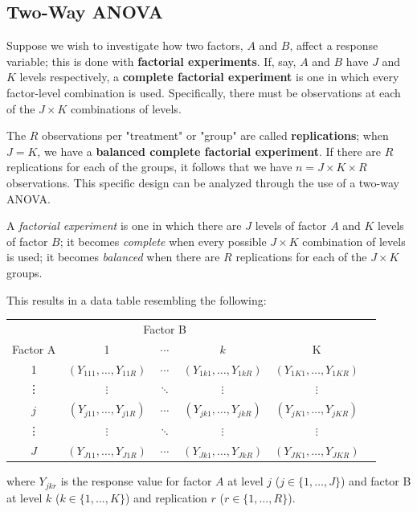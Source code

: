 \documentclass[12pt]{article}
\begin{document}
\subsection{Two-Way ANOVA}
Suppose we wish to investigate how two factors, $A$ and $B$, affect a response variable; this is done with \textbf{factorial experiments}. If, say, $A$ and $B$ have $J$ and $K$ levels respectively, a \textbf{complete factorial experiment} is one in which every factor-level combination is used. Specifically, there must be observations at each of the $J \times K$ combinations of levels.

The $R$ observations per "treatment" or "group" are called \textbf{replications}; when $J = K$, we have a \textbf{balanced complete factorial experiment}. If there are $R$ replications for each of the groups, it follows that we have $n = J \times K \times R$ observations. This specific design can be analyzed through the use of a two-way ANOVA. 

\begin{definitionEnd}
    A \emph{factorial experiment} is one in which there are $J$ levels of factor $A$ and $K$ levels of factor $B$; it becomes \emph{complete} when every possible $J \times K$ combination of levels is used; it becomes \emph{balanced} when there are $R$ replications for each of the $J \times K$ groups.
\end{definitionEnd}

This results in a data table resembling the following:

\begin{center}
\begin{tabular}{c c c c c c}
    & \multicolumn{3}{c}{Factor B} & \\
    \cline{2-4}
    Factor A & 1 & $\cdots$ & $k$ & K \\
    \hline1 & $(Y_{111}, \dots, Y_{11R})$ & $\cdots$ & $(Y_{1k1}, \dots, Y_{1kR})$ & $(Y_{1K1}, \dots, Y_{1KR})$ \\
    \vdots & $\vdots$ & $\ddots$ & $\vdots$ & $\vdots$ \\
    $j$ & $(Y_{j11}, \dots, Y_{j1R})$ & $\cdots$ & $(Y_{jk1}, \dots, Y_{jkR})$ & $(Y_{jK1}, \dots, Y_{jKR})$ \\
    \vdots & $\vdots$ & $\ddots$ & $\vdots$ & $\vdots$ \\
    $J$ & $(Y_{J11}, \dots, Y_{J1R})$ & $\cdots$ & $(Y_{Jk1}, \dots, Y_{JkR})$ & $(Y_{JK1}, \dots, Y_{JKR})$ \\
    \hline
\end{tabular}
\end{center}
where $Y_{jkr}$ is the response value for factor $A$ at level $j$ ($j \in \{1, \dots, J\}$) and factor B at level $k$ ($k \in \{1, \dots, K\}$) and replication $r$ ($r \in \{1, \dots, R\}$).
\end{document}
